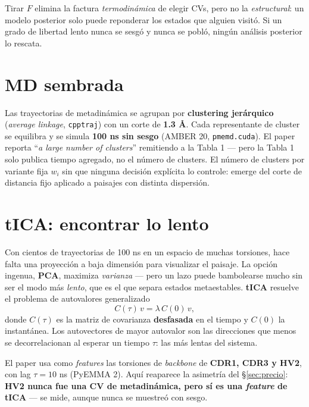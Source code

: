 \documentclass[11pt]{article}
\begin{document}
\vspace{1em}
\begin{aviso}
Tirar $F$ elimina la factura \emph{termodinámica} de elegir CVs, pero no la \emph{estructural}: un modelo posterior solo puede reponderar los estados que alguien visitó. Si un grado de libertad lento nunca se sesgó y nunca se pobló, ningún análisis posterior lo rescata.
\end{aviso}

\section{MD sembrada}

Las trayectorias de metadinámica se agrupan por \textbf{clustering jerárquico} (\textit{average linkage}, \texttt{cpptraj}) con un corte de \textbf{1.3 \r{A}}. Cada representante de cluster se equilibra y se simula \textbf{100 ns sin sesgo} (AMBER 20, \texttt{pmemd.cuda}). El paper reporta ``\textit{a large number of clusters}'' remitiendo a la Tabla 1 --- pero la Tabla 1 solo publica tiempo agregado, no el número de clusters. El número de clusters por variante fija $w_i$ sin que ninguna decisión explícita lo controle: emerge del corte de distancia fijo aplicado a paisajes con distinta dispersión.

\section{tICA: encontrar lo lento}

Con cientos de trayectorias de 100 ns en un espacio de muchas torsiones, hace falta una proyección a baja dimensión para visualizar el paisaje. La opción ingenua, \textbf{PCA}, maximiza \emph{varianza} --- pero un lazo puede bambolearse mucho sin ser el modo más \emph{lento}, que es el que separa estados metaestables. \textbf{tICA} resuelve el problema de autovalores generalizado
$$C(\tau)\,v = \lambda\,C(0)\,v,$$
donde $C(\tau)$ es la matriz de covarianza \textbf{desfasada} en el tiempo y $C(0)$ la instantánea. Los autovectores de mayor autovalor son las direcciones que menos se decorrelacionan al esperar un tiempo $\tau$: las más lentas del sistema.

El paper usa como \emph{features} las torsiones de \emph{backbone} de \textbf{CDR1, CDR3 y HV2}, con lag $\tau=10$ ns (PyEMMA 2). Aquí reaparece la asimetría del \S\ref{sec:precio}: \textbf{HV2 nunca fue una CV de metadinámica, pero sí es una \emph{feature} de tICA} --- se mide, aunque nunca se muestreó con sesgo.
\end{document}
